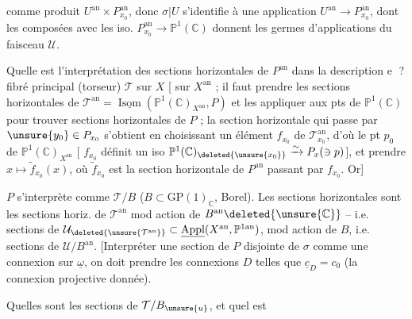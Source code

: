 comme produit $U^{\mathrm{an}}\times P_{x_0}^{\mathrm{an}}$, donc $\sigma|U$ s'identifie à une application $U^{\mathrm{an}}\longrightarrow P_{x_0}^{\mathrm{an}}$, dont les composées avec les iso. $P_{x_0}^{\mathrm{an}}\longrightarrow\mathbb P^1(\mathbb C)$ donnent les germes d'applications  du faisceau $\mathcal U$.

Quelle est l'interprétation des sections horizontales  de $P^{\mathrm{an}}$ dans la description \textcircled{e} ?  fibré principal (torseur) $\mathcal T$ sur $X$ [ sur $X^{\mathrm{an}}$ ; il faut prendre les sections horizontales de $\mathcal T^{\mathrm{an}}=\underline{\operatorname{Isom}}(\mathbb P^1(\mathbb C)_{X^{\mathrm{an}}},P)$ et les appliquer aux pts de $\mathbb P^1(\mathbb C)$ pour trouver sections horizontales de $P$ ; la section horizontale qui passe par $\unsure{y_0}\in P_{x_0}$ s'obtient en choisissant un  élément $f_{x_0}$ de $\mathcal T_{x_0}^{\mathrm{an}}$, d'où  le pt $p_0$ de $\mathbb P^1(\mathbb C)_{X^{\mathrm{an}}}$ [ $f_{x_0}$ définit un iso $\mathbb P^1(\mathbb C)_{\deleted{\unsure{x_0}}}\xrightarrow{\sim}P_x(\ni p)$], et prendre $x\mapsto\widetilde f_{x_0}(x)$, où $\widetilde f_{x_0}$ est la section horizontale  de $P^{\mathrm{an}}$ passant par $f_{x_0}$. Or]

$P$ s'interprète comme $\mathcal T/B$ ($B\subset\mathrm{GP}(1)_{\mathbb C}$, Borel). Les sections  horizontales  sont les sections horiz. de $\mathcal T^{\mathrm{an}}$ mod action de $B^{\mathrm{an}}\deleted{\unsure{\mathbb C}}$ -- i.e. sections de $\mathcal U_{\deleted{\unsure{\mathcal T^{\mathrm{an}}}}}\subset\underline{\operatorname{Appl}}(X^{\mathrm{an}},\mathbb P^{1\mathrm{an}})$, mod action de $B$, i.e. sections de $\mathcal U/B^{\mathrm{an}}$. [Interpréter une section de $P$ disjointe de $\sigma$ comme une connexion  sur $\underline\omega$,  on doit prendre les connexions $D$ telles que $\underline c_D=c_0$ (la connexion projective donnée).

Quelles sont les sections  de $\mathcal T/B_{\unsure{u}}$, et quel est
